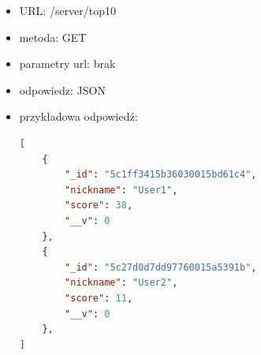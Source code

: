 \documentclass[12pt,a4paper]{article}
\begin{document}
\begin{itemize}
\begin{itemize}
        \item URL: /server/top10
        \item metoda: GET
        \item parametry url: brak
        \item odpowiedz: JSON
        \item przykładowa odpowiedź:
        \begin{lstlisting}[language=json,firstnumber=1]
[
    {
        "_id": "5c1ff3415b36030015bd61c4",
        "nickname": "User1",
        "score": 38,
        "__v": 0
    },
    {
        "_id": "5c27d0d7dd97760015a5391b",
        "nickname": "User2",
        "score": 11,
        "__v": 0
    },
]
\end{lstlisting}
    \end{itemize}
\end{itemize}
\clearpage
\end{document}
